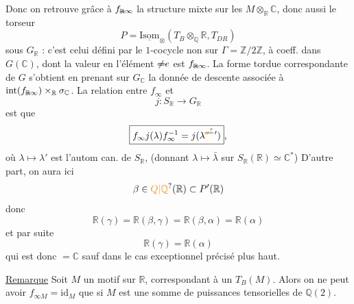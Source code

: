 Donc on retrouve grâce à $f_{\deleted{\mathbb R}\infty}$ la structure mixte sur
les $M\otimes_{\mathbb R}\mathbb C$, donc aussi le torseur
\[
P=\underline{\mathrm{Isom}}_\otimes(T_B\otimes_{\mathbb Q}\mathbb R,T_{DR})
\]
sous $G_{\mathbb R}$ : c'est celui défini par le $1$-cocycle  non 
sur $\Gamma=\mathbb Z/2\mathbb Z$, à coeff.  dans $G(\mathbb C)$, dont la valeur en
l'élément $\deleted{\ne}e$ est $f_{\deleted{\mathbb R}\infty}$. La forme tordue correspondante
de $G$ s'obtient en prenant sur $G_{\mathbb C}$ la donnée
de descente associée à  $\mathrm{int}(f_{\deleted{\mathbb R}\infty})\times_{\mathbb R}\sigma_{\mathbb C}$.  La relation entre $f_\infty$ et
\[
j:S_{\mathbb R}\longrightarrow G_{\mathbb R}
\]
est que
\[
\boxed{f_\infty j(\lambda) f_\infty^{-1}=j(\lambda^{\deleted{\unsure{\sigma}}\,\prime})},
\]
où $\lambda\mapsto\lambda'$ est l'autom can. de $S_{\mathbb R}$,
(donnant $\lambda\mapsto\bar\lambda$ sur $S_{\mathbb R}(\mathbb R)\simeq\mathbb C^*$)
D'autre part, on aura ici
\[
\beta\in\unsure{Q|\mathbb Q}(\mathbb R)\subset P'(\mathbb R)
\]
donc
\[
\mathbb R(\gamma)=\mathbb R(\beta,\gamma)=\mathbb R(\beta,\alpha)=\mathbb R(\alpha)
\]
et par suite
\[
\mathbb R(\gamma)=\mathbb R(\alpha)
\]
qui est donc $=\mathbb C$ sauf dans le cas exceptionnel précisé
plus haut.

\uline{Remarque} Soit $M$ un motif sur $\mathbb R$, correspondant à un  $T_B(M)$. Alors on ne peut avoir $f_{\infty M}=\mathrm{id}_M$ que
si $M$ est une somme de puissances tensorielles
de $\mathbb Q(2)$.


